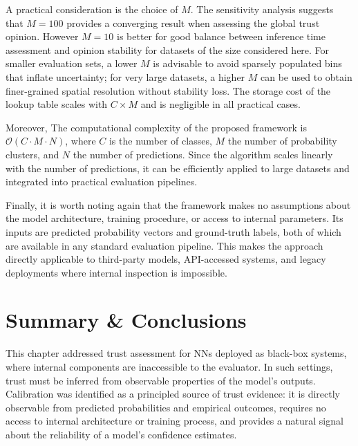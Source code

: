 A practical consideration is the choice of $M$. The sensitivity analysis suggests that $M = 100$ provides a converging result when assessing the global trust opinion. However $M = 10$ is better for good balance between inference time assessment and opinion stability for datasets of the size considered here. For smaller evaluation sets, a lower $M$ is advisable to avoid sparsely populated bins that inflate uncertainty; for very large datasets, a higher $M$ can be used to obtain finer-grained spatial resolution without stability loss. The storage cost of the lookup table scales with $C \times M$ and is negligible in all practical cases.

Moreover, The computational complexity of the proposed framework is $\mathcal{O}(C \cdot M \cdot N)$, where $C$ is the number of classes, $M$ the number of probability clusters, and $N$ the number of predictions. Since the algorithm scales linearly with the number of predictions, it can be efficiently applied to large datasets and integrated into practical evaluation pipelines.

Finally, it is worth noting again that the framework makes no assumptions about the model architecture, training procedure, or access to internal parameters. Its inputs are predicted probability vectors and ground-truth labels, both of which are available in any standard evaluation pipeline. This makes the approach directly applicable to third-party models, API-accessed systems, and legacy deployments where internal inspection is impossible.



\section{Summary \& Conclusions}

This chapter addressed trust assessment for \acp{NN} deployed as black-box systems, where internal components are inaccessible to the evaluator. In such settings, trust must be inferred from observable properties of the model's outputs. Calibration was identified as a principled source of trust evidence: it is directly observable from predicted probabilities and empirical outcomes, requires no access to internal architecture or training process, and provides a natural signal about the reliability of a model's confidence estimates.

